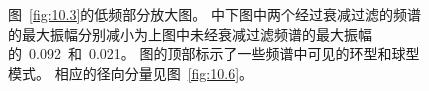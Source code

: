 \begin{figure}
\begin{center}
\end{center}
\caption[thrust zoom1]{
\label{fig:10.4}
图~\protect\ref{fig:10.3}的低频部分放大图。
中下图中两个经过衰减过滤的频谱的最大振幅分别减小为上图中未经衰减过滤频谱的最大振幅的~0.092~和~0.021。
图的顶部标示了一些频谱中可见的环型和球型模式。
相应的径向分量见图~\protect\ref{fig:10.6}。}
\end{figure}
